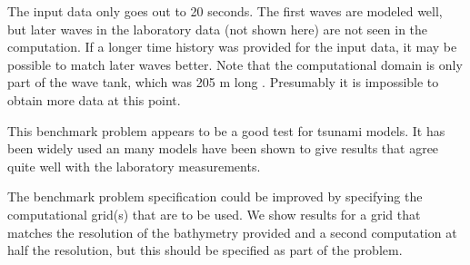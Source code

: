 

The input data only goes out to 20 seconds.
The first waves are modeled well, but later waves  in the laboratory data
(not shown here) are not seen in the
computation.  If a longer time history was provided for the input data, it
may be possible to match later waves better.  Note that the computational
domain is only part of the wave tank, which was 205 m long
\cite{MatsuyamaTanaka:monai}.
Presumably it is impossible to obtain more data at this point.

This benchmark problem appears to be a good test for tsunami models.  It has
been widely used an many models have been shown to give results that agree
quite well with the laboratory measurements.

The benchmark problem specification could be improved by specifying the
computational grid(s) that are to be used.  We show results for a grid that
matches the resolution of the bathymetry provided and a second computation
at half the resolution, but this should be specified as part of the problem.


